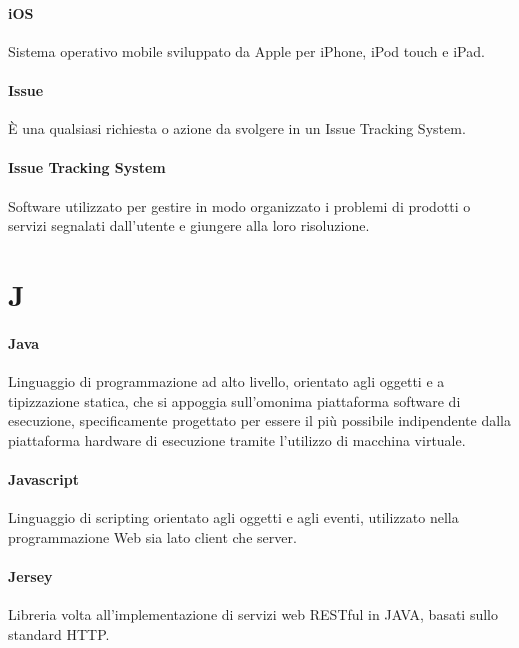 \documentclass[]{article}
\begin{document}
	\paragraph*{iOS}
	Sistema operativo mobile sviluppato da Apple per iPhone, iPod touch e iPad.
	
	\paragraph*{Issue}
	È una qualsiasi richiesta o azione da svolgere in un Issue Tracking System.
		
	\paragraph*{Issue Tracking System}
	Software utilizzato per gestire in modo organizzato i problemi di prodotti o servizi segnalati dall’utente e giungere alla loro risoluzione.
		
	\newpage
	
	\section*{J}
	
	\paragraph*{Java}
	Linguaggio di programmazione ad alto livello, orientato agli oggetti e a tipizzazione statica, che si appoggia sull'omonima piattaforma software di esecuzione, specificamente progettato per essere il più possibile indipendente dalla piattaforma hardware di esecuzione tramite l'utilizzo di macchina virtuale.
	
	\paragraph*{Javascript}
	Linguaggio di scripting orientato agli oggetti e agli eventi, utilizzato nella programmazione Web sia lato client che server.
	
	\paragraph*{Jersey}
	Libreria volta all'implementazione di servizi web RESTful in JAVA, basati sullo standard HTTP.
	
	\newpage
	
\end{document}

